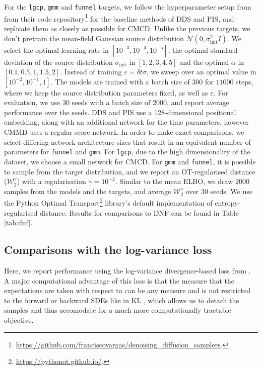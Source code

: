     For the \texttt{lgcp}, \texttt{gmm} and \texttt{funnel} targets, we follow the hyperparameter setup from \textcite{vargas2023denoising} from their code repository\footnote{\url{https://github.com/franciscovargas/denoising_diffusion_samplers}.} for the baseline methods of DDS and PIS, and replicate them as closely as possible for CMCD. Unlike the previous targets, we don't pretrain the mean-field Gaussian source distribution $\mathcal{N}(0, \sigma_{\text{init}}^2 I)$. We select the optimal learning rate in $[10^{-3}, 10^{-4}, 10^{-5}]$, the optimal standard deviation of the source distribution $\sigma_{\text{init}}$ in $[1, 2, 3, 4, 5]$ and the optimal $\alpha$ in $[0.1, 0.5, 1, 1.5, 2]$. Instead of training $\varepsilon = \delta t \sigma$, we sweep over an optimal value in $[10^{-2}, 10^{-1}, 1]$. The models are trained with a batch size of $300$ for $11000$ steps, where we keep the source distribution parameters fixed, as well as $\varepsilon$. For evaluation, we use 30 seeds with a batch size of 2000, and report average performance over the seeds. DDS and PIS use a 128-dimensional positional embedding, along with an additional network for the time parameters, however CMMD uses a regular score network. In order to make exact comparisons, we select differing network architecture sizes that result in an equivalent number of parameters for \texttt{funnel} and \texttt{gmm}. For \texttt{lgcp}, due to the high dimensionality of the dataset, we choose a small network for CMCD. For \texttt{gmm} and \texttt{funnel}, it is possible to sample from the target distribution, and we report an OT-regularised distance ($\mathcal{W}_2^{\gamma}$) with a regularisation $\gamma = 10^{-2}$. Similar to the mean ELBO, we draw 2000 samples from the models and the targets, and average $\mathcal{W}_2^{\gamma}$ over 30 seeds. We use the Python Optimal Transport\footnote{\url{https://pythonot.github.io/}.} library's default implementation of entropy-regularised distance. Results for comparisons to DNF can be found in Table \ref{tab:dnf}.

    \subsection{Comparisons with the log-variance loss}

Here, we report performance using the log-variance divergence-based loss from . A major computational advantage of this loss is that the measure that the expectations are taken with respect to can be any measure and is not restricted to the forward or backward SDEs like in KL \parencite{richter2023improved,richter2020vargrad,nusken2021solving}, which allows us to detach the samples and thus accomodate for a much more computationally tractable objective.

